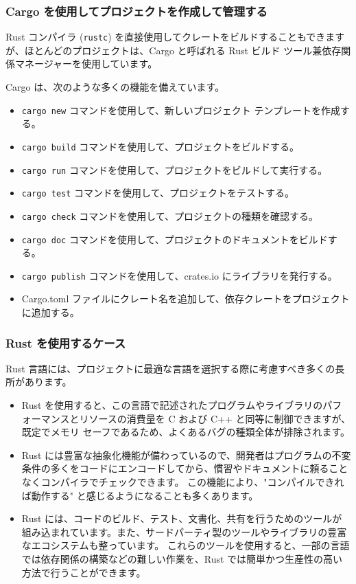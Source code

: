 \subsubsection{Cargo を使用してプロジェクトを作成して管理する}

Rust コンパイラ (\texttt{rustc}) を直接使用してクレートをビルドすることもできますが、ほとんどのプロジェクトは、Cargo と呼ばれる Rust ビルド ツール兼依存関係マネージャーを使用しています。

Cargo は、次のような多くの機能を備えています。

\begin{itemize}
\item \texttt{cargo new} コマンドを使用して、新しいプロジェクト テンプレートを作成する。
\item \texttt{cargo build} コマンドを使用して、プロジェクトをビルドする。
\item \texttt{cargo run} コマンドを使用して、プロジェクトをビルドして実行する。
\item \texttt{cargo test} コマンドを使用して、プロジェクトをテストする。
\item \texttt{cargo check} コマンドを使用して、プロジェクトの種類を確認する。
\item \texttt{cargo doc} コマンドを使用して、プロジェクトのドキュメントをビルドする。
\item \texttt{cargo publish} コマンドを使用して、crates.io にライブラリを発行する。
\item Cargo.toml ファイルにクレート名を追加して、依存クレートをプロジェクトに追加する。
\end{itemize}

\subsubsection{Rust を使用するケース}

Rust 言語には、プロジェクトに最適な言語を選択する際に考慮すべき多くの長所があります。

\begin{itemize}
\item Rust を使用すると、この言語で記述されたプログラムやライブラリのパフォーマンスとリソースの消費量を C および C++ と同等に制御できますが、既定でメモリ セーフであるため、よくあるバグの種類全体が排除されます。
\item Rust には豊富な抽象化機能が備わっているので、開発者はプログラムの不変条件の多くをコードにエンコードしてから、慣習やドキュメントに頼ることなくコンパイラでチェックできます。 この機能により、"コンパイルできれば動作する" と感じるようになることも多くあります。
\item Rust には、コードのビルド、テスト、文書化、共有を行うためのツールが組み込まれています。また、サードパーティ製のツールやライブラリの豊富なエコシステムも整っています。 これらのツールを使用すると、一部の言語では依存関係の構築などの難しい作業を、Rust では簡単かつ生産性の高い方法で行うことができます。
\end{itemize}


